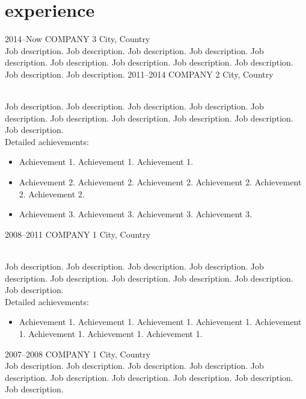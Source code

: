 \documentclass[]{cv-style}          %
\begin{document}

\section{experience}

\begin{entrylist}
\entry
  {2014--Now}
  {COMPANY 3}
  {City, Country}
  {\\
  Job description. Job description. Job description. Job description. Job description. Job description. Job description. Job description. Job description. Job description. Job description.}
\entry
  {2011--2014}
  {COMPANY 2}
  {City, Country}
  {\\
  Job description. Job description. Job description. Job description. Job description. Job description. Job description. Job description. Job description. Job description.\\
  Detailed achievements:
  \begin{itemize}
    \item Achievement 1. Achievement 1. Achievement 1. 
    \item Achievement 2. Achievement 2. Achievement 2. Achievement 2. Achievement 2. Achievement 2.
    \item Achievement 3. Achievement 3. Achievement 3. Achievement 3.  
  \end{itemize}}
\entry
  {2008--2011}
  {COMPANY 1}
  {City, Country}
  {\\
  Job description. Job description. Job description. Job description. Job description. Job description. Job description. Job description. Job description. Job description.\\
  Detailed achievements:
  \begin{itemize}
    \item Achievement 1. Achievement 1. Achievement 1. Achievement 1. Achievement 1. Achievement 1. Achievement 1. Achievement 1. 
  \end{itemize}}
\entry
  {2007--2008}
  {COMPANY 1}
  {City, Country}
  {\\
  Job description. Job description. Job description. Job description. Job description. Job description. Job description. Job description. Job description. Job description.\\}

\end{entrylist}
\end{document}
